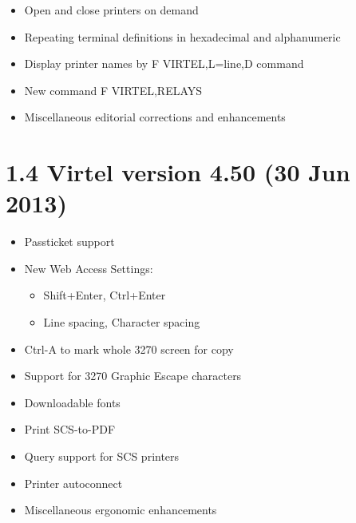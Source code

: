 \documentclass[letterpaper,10pt,english]{sphinxmanual}
\begin{document}
\begin{itemize}
\item {} 
Open and close printers on demand

\item {} 
Repeating terminal definitions in hexadecimal and alphanumeric

\item {} 
Display printer names by F VIRTEL,L=line,D command

\item {} 
New command F VIRTEL,RELAYS

\item {} 
Miscellaneous editorial corrections and enhancements

\end{itemize}


\section{1.4 Virtel version 4.50 (30 Jun 2013)}
\label{\detokenize{Installation_Guide:virtel-version-4-50-30-jun-2013}}
\begin{itemize}
\item {} 
Passticket support

\item {} 
New Web Access Settings:
\begin{itemize}
\item {} 
Shift+Enter, Ctrl+Enter

\item {} 
Line spacing, Character spacing

\end{itemize}

\item {} 
Ctrl-A to mark whole 3270 screen for copy

\item {} 
Support for 3270 Graphic Escape characters

\item {} 
Downloadable fonts

\item {} 
Print SCS-to-PDF

\item {} 
Query support for SCS printers

\item {} 
Printer autoconnect

\item {} 
Miscellaneous ergonomic enhancements

\end{itemize}
\end{document}
